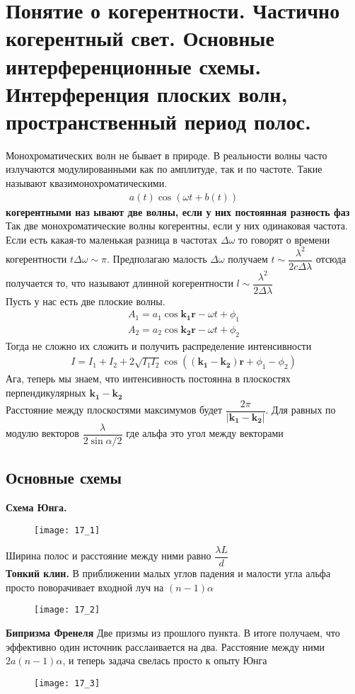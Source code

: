 
	\section{Понятие о когерентности. Частично когерентный свет. Основные интерференционные
		схемы. Интерференция плоских волн, пространственный период полос.}
	Монохроматических волн не бывает в природе. В реальности волны часто излучаются модулированными как по амплитуде, так и по частоте. Такие называют квазимонохроматическими. 
	\begin{align*}
	a(t) \cos (\omega t + b(t))
	\end{align*}
	\textbf{когерентными наз ывают две волны, если у них постоянная разность фаз}\\
	Так две монохроматические волны когерентны, если у них одинаковая частота.\\
	Если есть какая-то маленькая разница в частотах $\Delta \omega$ то говорят о времени когерентности $t \Delta \omega \sim \pi$. Предполагаю малость $\Delta \omega$ получаем $t \sim \dfrac{\lambda^2}{2c \Delta \lambda}$ отсюда получается то, что называют длинной когерентности $l \sim \dfrac{\lambda^2}{2\Delta \lambda}$\\
	Пусть у нас есть две плоские волны. 
	\begin{align*}
	A_1 = a_1 \cos \mathbf{k_1 r} - \omega t + \phi_1\\
		A_2 = a_2 \cos \mathbf{k_2 r} - \omega t + \phi_2
	\end{align*}
	Тогда не сложно их сложить и получить распределение интенсивности
	\begin{align*}
	I = I_1 + I_2 + 2\sqrt{I_1 I_2} \cos( \mathbf{(k_1 - k_2)r} + \phi_1 - \phi_2 )
	\end{align*}
	Ага, теперь мы знаем, что интенсивность постоянна в плоскостях перпендикулярных $\mathbf{k_1 - k_2}$ \\
	Расстояние между плоскостями максимумов будет $\dfrac{2\pi}{|\mathbf{k_1 - k_2}|}$. Для равных по модулю векторов $\dfrac{\lambda}{2 \sin \alpha/2}$ где альфа это угол между векторами\\
	\subsection{Основные схемы}
	\textbf{Схема Юнга.} 
	\begin{figure}[h]
		\texttt{[image: 17\_1]}
	\end{figure}
	Ширина полос и расстояние между ними равно $\dfrac{\lambda L}{d}$\\ 
	\textbf{Тонкий клин.} В приближении малых углов падения и малости угла альфа просто поворачивает входной луч на $(n-1)\alpha$\newpage
	\begin{figure}[h]
		\centering
		\texttt{[image: 17\_2]}
	\end{figure}
	\textbf{Бипризма Френеля} Две призмы из прошлого пункта. В итоге получаем, что эффективно один источник расслаивается на два. Расстояние между ними $2a(n-1)\alpha$, и теперь задача свелась просто к опыту Юнга \\
	\begin{figure}[H]
		\texttt{[image: 17\_3]}
	\end{figure}
